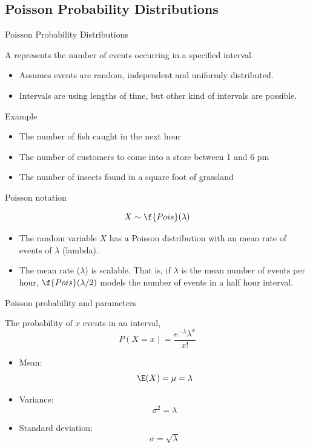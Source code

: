 \documentclass[xcolor=table, handout]{beamer}
\begin{document}
\subsection{Poisson Probability Distributions}

\begin{frame}{Poisson Probability Distributions}
\begin{block}{}
{\large A  represents the number of events occurring in a specified interval.} 
\begin{itemize}
\pause\item Assumes events are random, independent and uniformly distributed.
\pause\item Intervals are using lengths of time, but other kind of intervals are possible.
\end{itemize}
\end{block}
\pause
\begin{exampleblock}{Example}
\begin{itemize}
\item The number of fish caught in the next hour
\item The number of customers to come into a store between 1 and 6 pm
\item The number of insects found in a square foot of grassland
\end{itemize}
\end{exampleblock}
\end{frame}

\begin{frame}{Poisson notation}
\begin{block}{}
\[X \sim \f{Pois}(\lambda)\]
\begin{itemize}
\pause\item The random variable $X$ has a Poisson distribution with an mean rate of events of $\lambda$ (lambda).
\pause\item The mean rate ($\lambda$) is scalable. That is, if $\lambda$ is the mean number of events per hour, $\f{Pois}(\lambda/2)$ models the number of events in a half hour interval.
\end{itemize}
\end{block}
\end{frame}

\begin{frame}{Poisson probability and parameters}
\begin{block}{}
The probability of $x$ events in an interval,
\[P(X=x) = \frac{e^{-\lambda}\lambda^x}{x!}\]
\begin{itemize}
\vspace*{-\baselineskip}\pause\item Mean: \[\E(X) = \mu = \lambda\]
\vspace*{-\baselineskip}\pause\item Variance: \[\sigma^2 = \lambda\]
\vspace*{-\baselineskip}\pause\item Standard deviation: \[\sigma = \sqrt \lambda \]
\end{itemize}
\end{block}
\end{frame}
\end{document}
